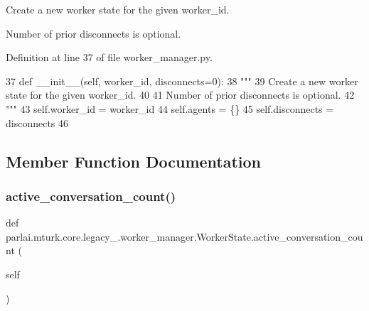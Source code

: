 \begin{DoxyVerb}Create a new worker state for the given worker_id.

Number of prior disconnects is optional.
\end{DoxyVerb}
 

Definition at line 37 of file worker\+\_\+manager.\+py.


\begin{DoxyCode}
37     \textcolor{keyword}{def }\_\_init\_\_(self, worker\_id, disconnects=0):
38         \textcolor{stringliteral}{"""}
39 \textcolor{stringliteral}{        Create a new worker state for the given worker\_id.}
40 \textcolor{stringliteral}{}
41 \textcolor{stringliteral}{        Number of prior disconnects is optional.}
42 \textcolor{stringliteral}{        """}
43         self.worker\_id = worker\_id
44         self.agents = \{\}
45         self.disconnects = disconnects
46 
\end{DoxyCode}


\subsection{Member Function Documentation}
\mbox{\label{classparlai_1_1mturk_1_1core_1_1legacy__2018_1_1worker__manager_1_1WorkerState_a0f22df8925f5461e6a55ddd6b2cc22b3}} 
\subsubsection{\texorpdfstring{active\+\_\+conversation\+\_\+count()}{active\_conversation\_count()}}
{\footnotesize\ttfamily def parlai.\+mturk.\+core.\+legacy\+\_.\+worker\+\_\+manager.\+Worker\+State.\+active\+\_\+conversation\+\_\+count (\begin{DoxyParamCaption}\item[{}]{self }\end{DoxyParamCaption})}

